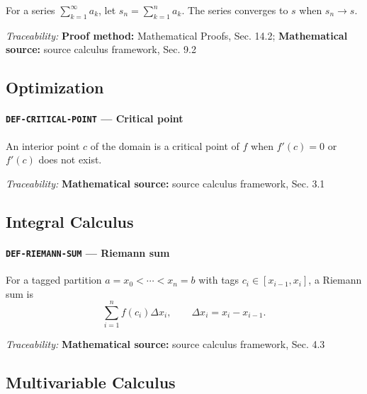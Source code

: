 \documentclass[10pt]{article}
\newcommand{\pidraw}[1]{\begingroup\urlstyle{tt}\nolinkurl{#1}\endgroup}
\theoremstyle{definition}
\theoremstyle{remark}
\begin{document}
For a series $\sum_{k=1}^{\infty}a_k$, let $s_n=\sum_{k=1}^n a_k$. The series converges to $s$ when $s_n\to s$.

\smallskip\noindent\textit{Traceability:} \textbf{Proof method:} Mathematical Proofs, Sec. 14.2; \textbf{Mathematical source:} source calculus framework, Sec. 9.2\par

\subsection{Optimization}

\label{prf:DEF-CRITICAL-POINT}

\paragraph{\pidraw{DEF-CRITICAL-POINT} --- Critical point}

An interior point $c$ of the domain is a critical point of $f$ when $f'(c)=0$ or $f'(c)$ does not exist.

\smallskip\noindent\textit{Traceability:} \textbf{Mathematical source:} source calculus framework, Sec. 3.1\par

\subsection{Integral Calculus}

\label{prf:DEF-RIEMANN-SUM}

\paragraph{\pidraw{DEF-RIEMANN-SUM} --- Riemann sum}

For a tagged partition $a=x_0<\cdots<x_n=b$ with tags $c_i\in[x_{i-1},x_i]$, a Riemann sum is
 \[
 \sum_{i=1}^n f(c_i)\Delta x_i,\qquad \Delta x_i=x_i-x_{i-1}.
 \]

\smallskip\noindent\textit{Traceability:} \textbf{Mathematical source:} source calculus framework, Sec. 4.3\par

\subsection{Multivariable Calculus}

\label{prf:DEF-DIFFERENTIABLE-RN}
\end{document}
